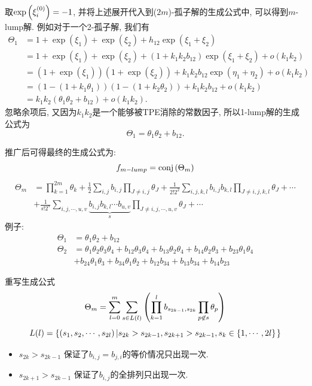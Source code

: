 \begin{frame}
取$\exp\left(\xi_i^{(0)}\right)=-1$, 并将上述展开代入到($2m$)-孤子解的生成公式中, 可以得到$m$-lump解. 例如对于一个2-孤子解, 我们有 
\begin{equation*}
\begin{aligned}
\Theta_1&=1+\exp(\xi_1)+\exp(\xi_2)+h_{12}\exp(\xi_1+\xi_2) \\ 
&= 1+\exp(\xi_1)+\exp(\xi_2)+(1+k_1k_2b_{12})\exp(\xi_1+\xi_2) +o(k_1 k_2)\\ 
&=(1+\exp(\xi_1))(1+\exp(\xi_2))+k_1k_2b_{12}\exp(\eta_1+\eta_2) +o(k_1 k_2)\\ 
&=(1-(1+k_1\theta_1))(1-(1+k_2\theta_2))+k_1k_2b_{12} +o(k_1 k_2)\\
&=k_1k_2(\theta_1\theta_2+b_{12})+o(k_1 k_2).
\end{aligned}
\end{equation*}
忽略余项后, 又因为$k_1k_2$是一个能够被TPE消除的常数因子, 所以1-lump解的生成公式为
\begin{equation*}
    \Theta_1=\theta_1\theta_2+b_{12}.
\end{equation*}
\end{frame}
\begin{frame}
推广后可得最终的生成公式为:
\[
    f_{m-lump}={\rm conj}\left(\Theta_m\right)
\]
\[
\begin{aligned}
    \Theta_m&=\prod_{k=1}^{2m}\theta_k+\frac{1}{2}\sum_{i,j}{b_{i,j}}\prod_{J\neq i,j}{\theta_J}+\frac{1}{2! 2^2}\sum_{i,j,k,l}{b_{i,j}b_{k,l}}\prod_{J\neq i,j,k,l}{\theta_{J}}+\cdots \\
    &+\frac{1}{s!2^s}\sum_{i,j,\cdots,u,v}\underbrace{{b_{i,j}b_{k,l}\cdots b_{u,v}}}_{s}\prod_{J\neq i,j,\cdots, u,v}{\theta_J}+\cdots 
\end{aligned}
\]
例子:
\[
\begin{aligned}
\Theta_1&=\theta_{1}\theta_{2}+b_{12} \\
\Theta_2&=\theta_{1}\theta_{2}\theta_{3}\theta_{4}+b_{12}\theta_{3}\theta_{4}+b_{13}\theta_{2}\theta_{4}+b_{14}\theta_{2}\theta_{3}+b_{23}\theta_{1}\theta_{4}\\
&+b_{24}\theta_{1}\theta_{3}+b_{34}\theta_{1}\theta_{2}+b_{12}b_{34}+b_{13}b_{34}+b_{14}b_{23}
\end{aligned}
\]
\end{frame}

\begin{frame}
重写生成公式
\[
    \Theta_m =\sum_{l=0}^m\sum_{s\in L(l)}\left(\prod_{k=1}^l{b_{s_{2k-1},s_{2k}}}\prod_{p\not\in s}{\theta_p}\right)
\]
\[
    L(l)=\left\{\left(s_1, s_2, \cdots ,s_{2l}\right)\left|s_{2k}>s_{2k-1},s_{2k+1}>s_{2k-1},s_k\in \left\{1,\cdots,2l\right\}\right.\right\}
\]
\begin{itemize}
\item $s_{2k}>s_{2k-1}$ 保证了$b_{i,j}=b_{j,i}$的等价情况只出现一次. 
\item $s_{2k+1}>s_{2k-1}$ 保证了$b_{i,j}$的全排列只出现一次.
\end{itemize}
\end{frame}

